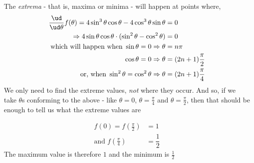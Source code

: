 \begin{solution}[\fullpage]
  The \textit{extrema} - that is, maxima or minima - will happen at points where,
  \begin{align}
     \dfrac{\ud}{\ud\theta}f(\theta) = 4\sin^3\theta\cos\theta - 4\cos^3\theta\sin\theta &= 0\\
        \Rightarrow 4\sin\theta\cos\theta\cdot(\sin^2\theta - \cos^2\theta) &= 0 \\
        \text{which will happen when } \sin\theta = 0 \Rightarrow \theta &= n\pi \\
              \cos\theta = 0 \Rightarrow \theta &= (2n+1)\frac{\pi}{2} \\
        \text{or, when } \sin^2\theta = \cos^2\theta \Rightarrow \theta &= (2n+1)\frac{\pi}{4}
  \end{align}
  We only need to find the extreme values, \textit{not} where they occur. And so, if we take $\theta$s
  conforming to the above - like $\theta = 0$, $\theta = \frac{\pi}{4}$ and $\theta = \frac{\pi}{2}$, then
  that should be enough to tell us what the extreme values are
  
  \begin{align}
     f(0) = f(\frac{\pi}{2}) &= 1 \\
     \text{and } f(\frac{\pi}{4}) &= \dfrac{1}{2}
  \end{align}
  The maximum value is therefore $1$ and the minimum is $\frac{1}{2}$
\end{solution}
